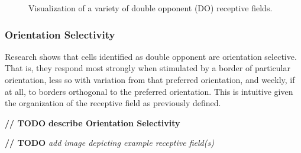 \documentclass[journal,onecolumn]{IEEEtran}
\begin{document}
\begin{figure}[H]
    \caption{Visualization of a variety of double opponent (DO) receptive fields.}
    \label{fig:rf-do}
\end{figure}

\subsubsection*{Orientation Selectivity}

Research shows that cells identified as double opponent are orientation selective. That is, they respond most strongly when stimulated by a border of particular orientation, less so with variation from that preferred orientation, and weekly, if at all, to borders orthogonal to the preferred orientation. This is intuitive given the organization of the receptive field as previously defined.

\textbf{// TODO} \textbf{describe Orientation Selectivity}

\textbf{// TODO} \textit{add image depicting example receptive field(s)}
\end{document}
